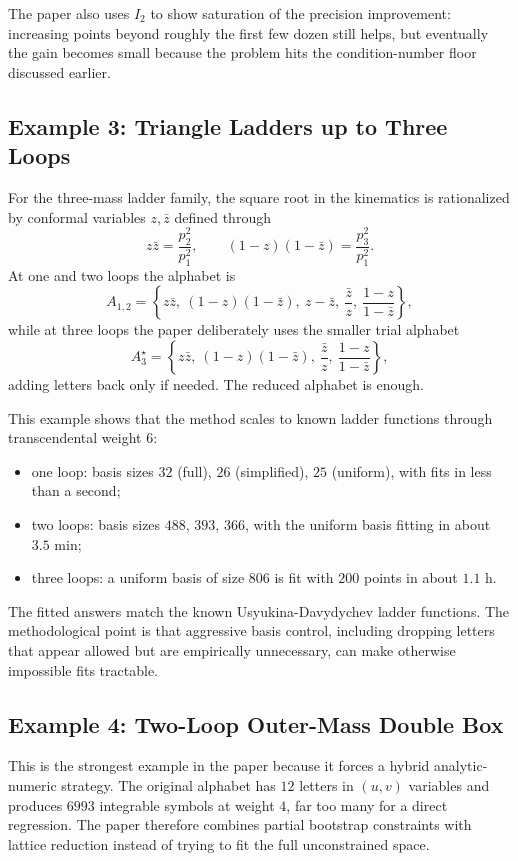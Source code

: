 \documentclass[11pt]{article}
\begin{document}
The paper also uses $I_2$ to show saturation of the precision improvement: increasing points beyond roughly the first few dozen still helps, but eventually the gain becomes small because the problem hits the condition-number floor discussed earlier.

\subsection{Example 3: Triangle Ladders up to Three Loops}
For the three-mass ladder family, the square root in the kinematics is rationalized by conformal variables $z,\bar z$ defined through
\[
z\bar z=\frac{p_2^2}{p_1^2}, \qquad (1-z)(1-\bar z)=\frac{p_3^2}{p_1^2}.
\]
At one and two loops the alphabet is
\[
A_{1,2}=\left\{
z\bar z,\ (1-z)(1-\bar z),\ z-\bar z,\ \frac{\bar z}{z},\ \frac{1-z}{1-\bar z}
\right\},
\]
while at three loops the paper deliberately uses the smaller trial alphabet
\[
A_3^\star=\left\{
z\bar z,\ (1-z)(1-\bar z),\ \frac{\bar z}{z},\ \frac{1-z}{1-\bar z}
\right\},
\]
adding letters back only if needed. The reduced alphabet is enough.

This example shows that the method scales to known ladder functions through transcendental weight $6$:
\begin{itemize}
    \item one loop: basis sizes $32$ (full), $26$ (simplified), $25$ (uniform), with fits in less than a second;
    \item two loops: basis sizes $488$, $393$, $366$, with the uniform basis fitting in about $3.5$ min;
    \item three loops: a uniform basis of size $806$ is fit with $200$ points in about $1.1$ h.
\end{itemize}
The fitted answers match the known Usyukina-Davydychev ladder functions. The methodological point is that aggressive basis control, including dropping letters that appear allowed but are empirically unnecessary, can make otherwise impossible fits tractable.

\subsection{Example 4: Two-Loop Outer-Mass Double Box}
This is the strongest example in the paper because it forces a hybrid analytic-numeric strategy. The original alphabet has $12$ letters in $(u,v)$ variables and produces $6993$ integrable symbols at weight $4$, far too many for a direct regression. The paper therefore combines partial bootstrap constraints with lattice reduction instead of trying to fit the full unconstrained space.
\end{document}
